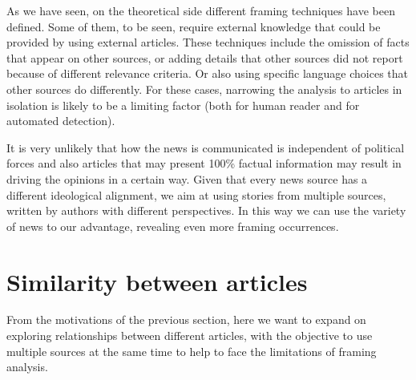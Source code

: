 As we have seen, on the theoretical side different framing techniques have been defined. Some of them, to be seen, require external knowledge that could be provided by using external articles.
These techniques include the omission of facts that appear on other sources, or adding details that other sources did not report because of different relevance criteria.
Or also using specific language choices that other sources do differently.
For these cases, narrowing the analysis to articles in isolation %
is likely to be a limiting factor (both for human reader and for automated detection).

It is very unlikely that how the news is communicated is independent of political forces and also articles that may present 100\% factual information may result in driving the opinions in a certain way.
Given that every news source has a different ideological alignment, we aim at using stories from multiple sources, written by authors with different perspectives.
In this way we can use the variety of news to our advantage, revealing even more framing occurrences.





\section{Similarity between articles}
\label{sec:lit_relationships}

From the motivations of the previous section, here we want to expand on exploring relationships between different articles, with the objective to use multiple sources at the same time to help to face the limitations of framing analysis.


